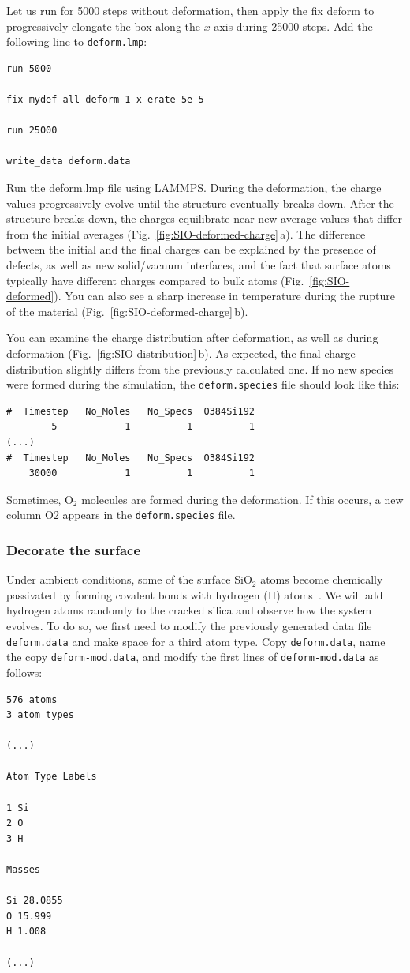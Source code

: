 \documentclass[9pt,tutorial]{livecoms}
\newcommand{\lmpcmd}[1]{\hspace{0pt}\colorbox{listing}{\textcolor{command}{\small{#1}}}\hspace{0pt}} %
\newcommand{\flecmd}[1]{\textcolor{command}{\texttt{#1}}} %
\begin{document}
Let us run for 5000 steps without deformation, then apply the \lmpcmd{fix deform}
to progressively elongate the box along the $x$-axis during 25000 steps.  Add
the following line to \flecmd{deform.lmp}:
\begin{lstlisting}
run 5000

fix mydef all deform 1 x erate 5e-5

run 25000

write_data deform.data
\end{lstlisting}
Run the \lmpcmd{deform.lmp} file using LAMMPS.  During the deformation, the charge
values progressively evolve until the structure eventually breaks down.  After the
structure breaks down, the charges equilibrate near new average values that differ
from the initial averages (Fig.~\ref{fig:SIO-deformed-charge}\,a).  The difference
between the initial and the final charges can be explained by the presence of
defects, as well as new solid/vacuum interfaces, and the fact that surface atoms
typically have different charges compared to bulk atoms (Fig.~\ref{fig:SIO-deformed}).
You can also see a sharp increase in temperature during the rupture of
the material (Fig.~\ref{fig:SIO-deformed-charge}\,b).

You can examine the charge distribution after deformation, as well as during
deformation (Fig.~\ref{fig:SIO-distribution}\,b).  As expected, the final
charge distribution slightly differs from the previously calculated one.  If
no new species were formed during the simulation, the \flecmd{deform.species} file
should look like this:
\begin{lstlisting}
#  Timestep   No_Moles   No_Specs  O384Si192
        5            1          1          1
(...)
#  Timestep   No_Moles   No_Specs  O384Si192
    30000            1          1          1
\end{lstlisting}
Sometimes, $\text{O}_2$ molecules are formed during the deformation.  If this occurs,
a new column \lmpcmd{O2} appears in the \flecmd{deform.species} file.

\subsubsection{Decorate the surface}

Under ambient conditions, some of the surface $\text{SiO}_2$ atoms become chemically
passivated by forming covalent bonds with hydrogen (H) atoms~\cite{sulpizi2012silica}.
We will add hydrogen atoms randomly to the cracked silica and observe how the
system evolves.  To do so, we first need to modify the previously generated data
file \flecmd{deform.data} and make space for a third atom type.
Copy \flecmd{deform.data}, name the copy \flecmd{deform-mod.data}, and modify the
first lines of \flecmd{deform-mod.data} as follows:
\begin{lstlisting}
576 atoms
3 atom types

(...)

Atom Type Labels

1 Si
2 O
3 H

Masses

Si 28.0855
O 15.999
H 1.008

(...)
\end{lstlisting}
\end{document}
